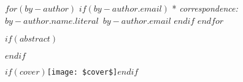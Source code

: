 \begin{minipage}[b][\textheight][s]{0.85\textwidth}
\vspace{1\baselineskip} 

$for(by-author)$
  $if(by-author.email)$
  * \textit{correspondence:}~$by-author.name.literal$~$by-author.email$
  $endif$
  $endfor$
  

$if(abstract)$
\begin{abstract}
$abstract$    
\end{abstract}
$endif$


\vfill

$if(cover)$\texttt{[image: \$cover\$]}$endif$
  
\vspace{0.1\textheight} 

\end{minipage}